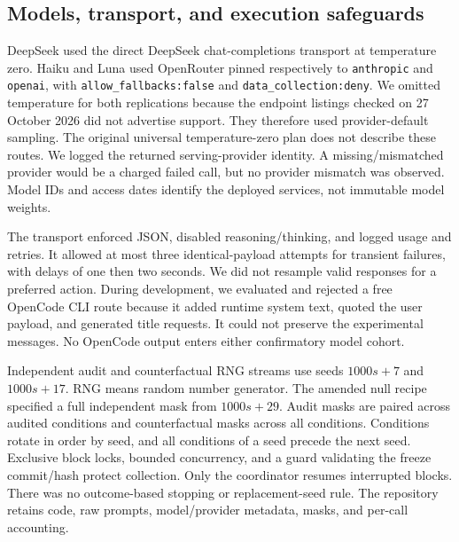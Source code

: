 \documentclass[a4paper]{article}
\begin{document}
\subsection{Models, transport, and execution safeguards}\label{sec:transport}
DeepSeek used the direct DeepSeek chat-completions transport at temperature zero. Haiku and Luna used OpenRouter pinned respectively to \texttt{anthropic} and \texttt{openai}, with \texttt{allow\_fallbacks:false} and \texttt{data\_collection:deny}. We omitted temperature for both replications because the endpoint listings checked on 27 October 2026 did not advertise support. They therefore used provider-default sampling. The original universal temperature-zero plan does not describe these routes. We logged the returned serving-provider identity. A missing/mismatched provider would be a charged failed call, but no provider mismatch was observed. Model IDs and access dates identify the deployed services, not immutable model weights.

The transport enforced JSON, disabled reasoning/thinking, and logged usage and retries. It allowed at most three identical-payload attempts for transient failures, with delays of one then two seconds. We did not resample valid responses for a preferred action. During development, we evaluated and rejected a free OpenCode CLI route because it added runtime system text, quoted the user payload, and generated title requests. It could not preserve the experimental messages. No OpenCode output enters either confirmatory model cohort.

Independent audit and counterfactual RNG streams use seeds $1000s+7$ and $1000s+17$. RNG means random number generator. The amended null recipe specified a full independent mask from $1000s+29$. Audit masks are paired across audited conditions and counterfactual masks across all conditions. Conditions rotate in order by seed, and all conditions of a seed precede the next seed. Exclusive block locks, bounded concurrency, and a guard validating the freeze commit/hash protect collection. Only the coordinator resumes interrupted blocks. There was no outcome-based stopping or replacement-seed rule. The repository retains code, raw prompts, model/provider metadata, masks, and per-call accounting.
\end{document}
